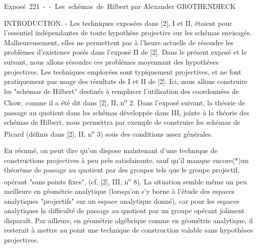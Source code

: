 \unit{Exposé 221 -- Les schémas de Hilbert}
%
  {par Alexander GROTHENDIECK}

\noindent INTRODUCTION. - Les techniques exposées dans [2], I et II, étaient pour l'essentiel
indépendantes de toute hypothèse projective sur les schémas envisagés.
Malheureusement, elles ne permettent pas à l'heure actuelle de résoudre les
problèmes d'existence posés dans l'exposé II de [2]. Dans le présent exposé et
le suivant, nous allons résoudre ces problèmes moyennant des hypothèses
projectives. Les techniques employées sont typiquement projectives, et ne font
pratiquement pas usage des résultats de I et II de [2]. Ici, nous allons
construire les "schémas de Hilbert" destinés à remplacer l'utilisation des
coordonnées de Chow, comme il a été dit dans [2], II, n\textsuperscript{o} 2.
Dans l'exposé suivant, la théorie de passage au quotient dans les schémas
développée dans III, jointe à la théorie des schémas de Hilbert, nous permettra
par exemple de construire les schémas de Picard (définis dans [2], II,
n\textsuperscript{o} 3) sous des conditions assez générales.

En résumé, on peut dire qu'on dispose maintenant d'une technique de
constructions projectives à peu près satisfaisante, sauf qu'il manque
encore\textnormal{(*)}\begingroup\renewcommand{\thefootnote}{(*)}\endgroup un théorème de passage au
quotient par des groupes tels que le groupe projectif, opérant "sans points
fixes", (cf. [2], III, n\textsuperscript{o} 8). La situation semble même un peu
meilleure en géométrie analytique (lorsqu'on s'y borne à l'étude des espaces
analytiques "projectifs" sur un espace analytique donné), car pour les
espaces analytiques la difficulté de passage au quotient par un groupe opérant
joliment disparaît. Par ailleurs, en géométrie algébrique comme en géométrie
analytique, il resterait à mettre au point une technique de construction
valable sans hypothèses projectives.



